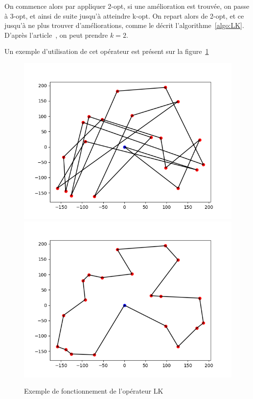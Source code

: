 \documentclass[a4paper,11pt]{article}%
\begin{document}
On commence alors par appliquer 2-opt, si une amélioration est trouvée, on passe à 3-opt, et ainsi de suite jusqu'à atteindre k-opt. 
On repart alors de 2-opt, et ce jusqu'à ne plus trouver d'améliorations, comme le décrit l'algorithme~\ref{algo:LK}.
D'après l'article~\cite{Sorensen_2017}, on peut prendre $k = 2$.
 
Un exemple d'utilisation de cet opérateur est présent sur la figure~\ref{LK}

\begin{figure}
\centering
\includegraphics[scale=0.4]{test4_20_init.png}
\includegraphics[scale=0.4]{test4_20_LKopt.png}

\caption{Exemple de fonctionnement de l'opérateur LK}
\label{LK}
\end{figure}
\end{document}
